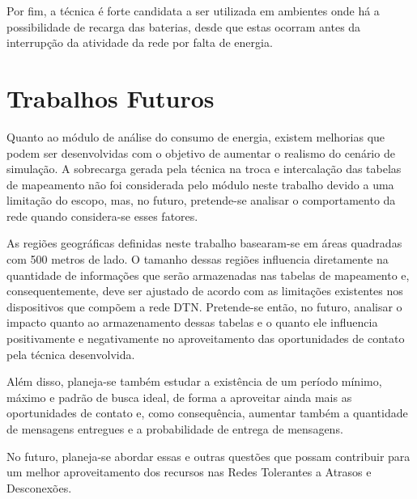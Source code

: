 Por fim, a técnica é forte candidata a ser utilizada em ambientes onde há a possibilidade de recarga das baterias, desde que estas ocorram antes da interrupção da atividade da rede por falta de energia.

\section{Trabalhos Futuros}

Quanto ao módulo de análise do consumo de energia, existem melhorias que podem ser desenvolvidas com o objetivo de aumentar o realismo do cenário de simulação. A sobrecarga gerada pela técnica na troca e intercalação das tabelas de mapeamento não foi considerada pelo módulo neste trabalho devido a uma limitação do escopo, mas, no futuro, pretende-se analisar o comportamento da rede quando considera-se esses fatores.

As regiões geográficas definidas neste trabalho basearam-se em áreas quadradas com 500 metros de lado. O tamanho dessas regiões influencia diretamente na quantidade de informações que serão armazenadas nas tabelas de mapeamento e, consequentemente, deve ser ajustado de acordo com as limitações existentes nos dispositivos que compõem a rede DTN. Pretende-se então, no futuro, analisar o impacto quanto ao armazenamento dessas tabelas e o quanto ele influencia positivamente e negativamente no aproveitamento das oportunidades de contato pela técnica desenvolvida. 

Além disso, planeja-se também estudar a existência de um período mínimo, máximo e padrão de busca ideal, de forma a aproveitar ainda mais as oportunidades de contato e, como consequência, aumentar também a quantidade de mensagens entregues e a probabilidade de entrega de mensagens.

No futuro, planeja-se abordar essas e outras questões que possam contribuir para um melhor aproveitamento dos recursos nas Redes Tolerantes a Atrasos e Desconexões.